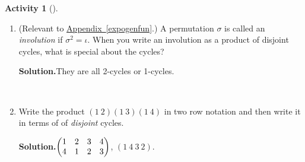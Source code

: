 \documentclass[10pt,]{book}
\theoremstyle{plain}
\theoremstyle{definition}
\newtheorem{activity}[project]{Activity}
\numberwithin{equation}{chapter}
\newcommand{\amp}{&}
\begin{document}
\begin{activity}[]\label{activity-272}
~\par
\begin{enumerate}[label=(\alph*)]
 \item (Relevant to \hyperref[expogenfun]{Appendix~\ref{expogenfun}}.) A permutation \(\sigma\) is called an \emph{involution} if \(\sigma^2=\iota\). When you write an involution as a product of disjoint cycles, what is special about the cycles?%
\par\medskip\noindent%
\textbf{Solution.}\quad They are all 2-cycles or 1-cycles.%

~\par
\item Write the product \((1\ 2)(1\ 3)(1\ 4)\) in two row notation and then write it in terms of of \emph{disjoint} cycles.%
\par\medskip\noindent%
\textbf{Solution.}\quad \(\begin{pmatrix}1\amp 2\amp 3\amp 4\cr4\amp 1\amp 2\amp 3
\end{pmatrix}\), \((1\ 4\ 3\ 2)\).%

\end{enumerate}
\end{activity}
\typeout{************************************************}
\typeout{************************************************}
\end{document}
